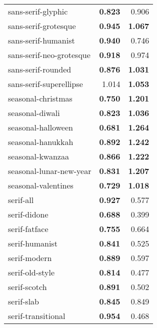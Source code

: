 \begin{longtable}{|l|r|r|}
sans-serif-glyphic        & \textbf{0.823}             & 0.906                   \\
sans-serif-grotesque      & \textbf{0.945}             & \textbf{1.067}          \\
sans-serif-humanist       & \textbf{0.940}             & 0.746                   \\
sans-serif-neo-grotesque  & \textbf{0.918}             & 0.974                   \\
sans-serif-rounded        & \textbf{0.876}             & \textbf{1.031}          \\
sans-serif-superellipse   & 1.014                      & \textbf{1.053}          \\
seasonal-christmas        & \textbf{0.750}             & \textbf{1.201}          \\
seasonal-diwali           & \textbf{0.823}             & \textbf{1.036}          \\
seasonal-halloween        & \textbf{0.681}             & \textbf{1.264}          \\
seasonal-hanukkah         & \textbf{0.892}             & \textbf{1.242}          \\
seasonal-kwanzaa          & \textbf{0.866}             & \textbf{1.222}          \\
seasonal-lunar-new-year   & \textbf{0.831}             & \textbf{1.207}          \\
seasonal-valentines       & \textbf{0.729}             & \textbf{1.018}          \\
serif-all                 & \textbf{0.927}             & 0.577                   \\
serif-didone              & \textbf{0.688}             & 0.399                   \\
serif-fatface             & \textbf{0.755}             & 0.664                   \\
serif-humanist            & \textbf{0.841}             & 0.525                   \\
serif-modern              & \textbf{0.889}             & 0.597                   \\
serif-old-style           & \textbf{0.814}             & 0.477                   \\
serif-scotch              & \textbf{0.891}             & 0.502                   \\
serif-slab                & \textbf{0.845}             & 0.849                   \\
serif-transitional        & \textbf{0.954}             & 0.468                  

\end{longtable}
